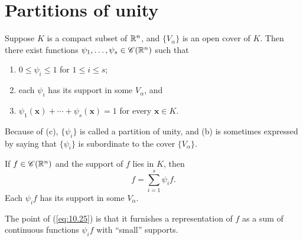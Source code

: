 
\section{Partitions of unity}

\begin{thm}
    \label{thm:10.8}
    Suppose $K$ is a compact subset of ${\protect\mathbb R}^n$,
    and $\{V_{\alpha}\}$ is an open cover of $K$.
    Then there exist functions $\psi_1, \dots, \psi_s \in \mathscr{C}({\protect\mathbb R}^n)$
    such that
    \begin{enumerate}
        \item $0 \leq \psi_i \leq 1$ for $1 \leq i \leq s$;
        \item each $\psi_i$ has its support in some $V_{\alpha}$, and
        \item $\psi_1 (\mathbf{x}) + \cdots + \psi_s(\mathbf{x}) = 1$ for every $\mathbf{x} \in K$.
    \end{enumerate}
\end{thm}

Because of (c), $\{\psi_i\}$ is called a partition of unity,
and (b) is sometimes expressed by saying that $\{\psi_i\}$ is subordinate to the cover $\{V_{\alpha}\}$.

\begin{myCorollary*}
    If $f \in \mathscr{C}({\protect\mathbb R}^n)$ and the support of $f$ lies in $K$, then
    \begin{equation}
        \label{eq:10.25}
        f = \sum_{i=1}^{s} \psi_i f .
    \end{equation}
    Each $\psi_i f$ has its support in some $V_{\alpha}$.
\end{myCorollary*}

The point of (\ref{eq:10.25}) is that it furnishes a representation of $f$ as a sum of continuous functions $\psi_i f$ with ``small'' supports.


